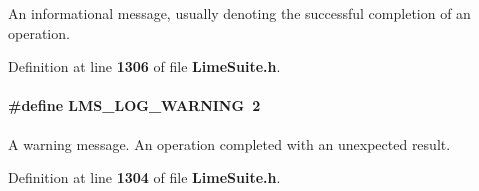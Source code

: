 An informational message, usually denoting the successful completion of an operation. 



Definition at line {\bf 1306} of file {\bf Lime\+Suite.\+h}.

\paragraph[{L\+M\+S\+\_\+\+L\+O\+G\+\_\+\+W\+A\+R\+N\+I\+NG}]{\setlength{\rightskip}{0pt plus 5cm}\#define L\+M\+S\+\_\+\+L\+O\+G\+\_\+\+W\+A\+R\+N\+I\+NG~2}\label{group__LMS__LOG__LEVEL_ga7e8f9c069720eb5d3baec17988771dca}


A warning message. An operation completed with an unexpected result. 



Definition at line {\bf 1304} of file {\bf Lime\+Suite.\+h}.

